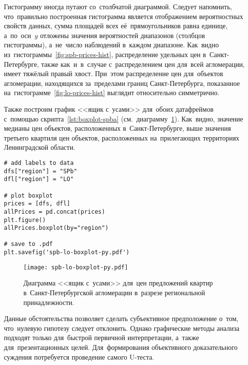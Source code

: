 \documentclass[]{scrreprt}
\begin{document}
Гистограмму иногда путают со~столбчатой диаграммой. Следует напомнить, что~правильно построенная гистограмма является отображением вероятностных свойств данных, сумма площадей всех её~прямоугольников равна единице, а~по~оси~$y$ отложены значения вероятностей диапазонов (столбцов гистограммы), а~не~число наблюдений в~каждом диапазоне. Как~видно из~гистограммы~\ref{fig:spb-prices-hist}, распределение удельных цен в~Санкт-Петербурге, также как~и~в~случае с~распределением цен для~всей агломерации, имеет тяжёлый правый хвост. При~этом распределение цен для~объектов агломерации, находящихся за~пределами границ Санкт-Петербурга, показанное на~гистограмме~\ref{fig:lo-prices-hist} выглядит относительно симметрично.

Также построим график <<ящик с~усами>> для~обоих датафреймов с~помощью скрипта~\ref{lst:boxplot-spba} (см.~диаграмму~\ref{fig:spb-lo-boxplot-py}). Как~видно, значение медианы цен объектов, расположенных в~Санкт-Петербурге, выше значения третьего квартиля цен объектов, расположенных на~прилегающих территориях Ленинградской области.
%
\begin{lstlisting}[float, caption = Построение диаграммы <<ящик с~усами>>~(boxplot) для~обеих подвыборок, firstnumber=1, label= lst:boxplot-spba]
# add labels to data
dfs["region"] = "SPb"
dfl["region"] = "LO"

# plot boxplot
prices = [dfs, dfl]
allPrices = pd.concat(prices)
plt.figure()
allPrices.boxplot(by="region")

# save to .pdf
plt.savefig('spb-lo-boxplot-py.pdf')
\end{lstlisting} 
%
\begin{figure}[ht]
	\centering
	\texttt{[image: spb-lo-boxplot-py.pdf]}
	\caption{Диаграмма <<ящик с~усами>> для~цен предложений квартир в~Санкт-Петербургской агломерации в~разрезе региональной принадлежности.}
	\label{fig:spb-lo-boxplot-py}
\end{figure}
%

Данные обстоятельства позволяет сделать субъективное предположение о~том, что~нулевую гипотезу следует отклонить. Однако графические методы анализа подходят только для~быстрой первичной интерпретации, а~также для~презентационных целей. Для~формирования объективного доказательного суждения потребуется проведение самого U-теста. 
\end{document}
